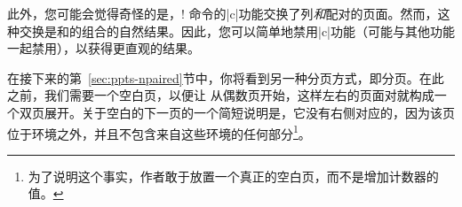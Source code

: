 
此外，您可能会觉得奇怪的是，\!\twosided! 命令的|c|功能交换了列\emph{和}配对的页面。然而，这种交换是\cswap{}和\paired{}\parapag{}的组合的自然结果。因此，您可以简单地禁用|c|功能（可能与其他功能一起禁用），以获得更直观的结果。


在接下来的第~\ref{sec:ppts-npaired}节中，你将看到另一种\parapag{}分页方式，即\npaired{}分页。在此之前，我们需要一个空白页，以便让\npaired{} \parapag{}从偶数页开始，这样左右的页面对就构成一个双页展开。关于空白的下一页的一个简短说明是，它没有右侧对应的\parapag{}，因为该页位于环境之外，并且不包含来自这些环境的任何部分\footnote{为了说明这个事实，作者敢于放置一个真正的空白页，而不是增加计数器的值。}。

% 